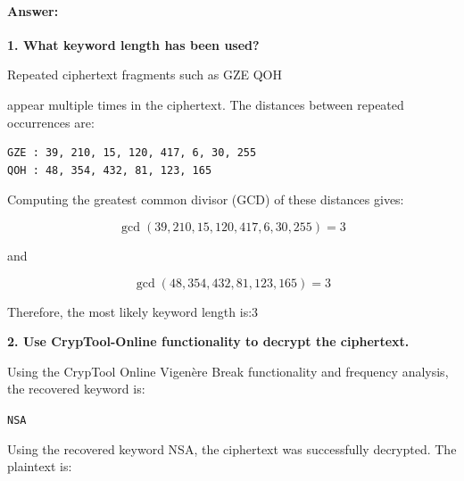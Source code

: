 \documentclass[]{scrartcl}
\begin{document}
\paragraph{Answer:}

\textbf{1. What keyword length has been used?}

Repeated ciphertext fragments such as GZE QOH


appear multiple times in the ciphertext. The distances between repeated
occurrences are:

\begin{verbatim}
GZE : 39, 210, 15, 120, 417, 6, 30, 255
QOH : 48, 354, 432, 81, 123, 165
\end{verbatim}

Computing the greatest common divisor (GCD) of these distances gives:

\[
\gcd(39,210,15,120,417,6,30,255)=3
\]

and

\[
\gcd(48,354,432,81,123,165)=3
\]

Therefore, the most likely keyword length is:3


\bigskip

\textbf{2. Use CrypTool-Online functionality to decrypt the ciphertext.}

Using the CrypTool Online Vigen\`ere Break functionality and
frequency analysis, the recovered keyword is:

\begin{center}
\texttt{NSA}
\end{center}

Using the recovered keyword NSA, the ciphertext was successfully
decrypted. The plaintext is:
\end{document}
